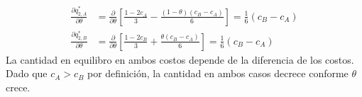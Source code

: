 \documentclass[12pt]{scrartcl} %
\begin{document}
\begin{Exercise}[name={Respuesta}]
\begin{enumerate}
\begin{align*}
      \frac{\partial q_{2,A}^*}{\partial \theta} &= \frac{\partial}{\partial \theta} \left[ \frac{1-2c_A}{3} - \frac{(1-\theta)(c_B-c_A)}{6} \right] = \frac{1}{6}(c_B - c_A) \\
      \frac{\partial q_{2,B}^*}{\partial \theta} &= \frac{\partial}{\partial \theta} \left[\frac{1-2c_B}{3} + \frac{\theta(c_B-c_A)}{6}\right] = \frac{1}{6}(c_B - c_A)
    \end{align*}
    La cantidad en equilibro en ambos costos depende de la diferencia de los costos. Dado que $ c_A > c_B $ por definición, la cantidad en ambos casos decrece conforme $ \theta $ crece. 
  \end{enumerate}
  
\end{Exercise}
\end{document}
